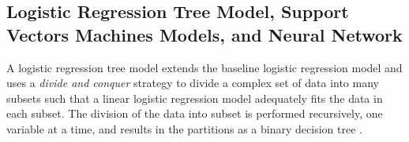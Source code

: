 \documentclass[12pt,english]{report}
\begin{document}

  
  
  


\subsection{Logistic Regression Tree Model, Support Vectors Machines Models,
and Neural Network }
A logistic regression tree model extends the baseline logistic regression model
and uses a \textit{divide and conquer} strategy to divide  a complex set of
data into many subsets such that a linear logistic regression model adequately
fits the data in each subset. The division of the data into subset is performed
recursively, one variable at a time, and results in the partitions as a binary
decision tree \citep{harrell2013regression_book}.
\end{document}
